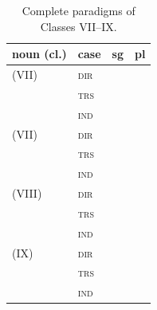 \begin{table}[ht]
  \footnotesize
  \caption{Complete paradigms of Classes VII--IX.}
  \ifparadigmappendix\else\label{tab:nm-paradigms-vii-ix}\fi
  \begin{tabularx}{\textwidth}{l l L L}
    \toprule
    {\sc noun (cl.)} & {\sc case} & {\sc sg} & {\sc pl} \\
    \midrule
     (VII) & \textsc{dir} &  &  \\
     & \textsc{trs} &  &  \\
     & \textsc{ind} &  &  \\
    \addlinespace
     (VII) & \textsc{dir} &  &  \\
     & \textsc{trs} &  &  \\
     & \textsc{ind} &  &  \\
    \addlinespace
     (VIII) & \textsc{dir} &  &  \\
     & \textsc{trs} &  &  \\
     & \textsc{ind} &  &  \\
    \addlinespace
     (IX) & \textsc{dir} &  &  \\
     & \textsc{trs} &  &  \\
     & \textsc{ind} &  &  \\
    \bottomrule
  \end{tabularx}
\end{table}
